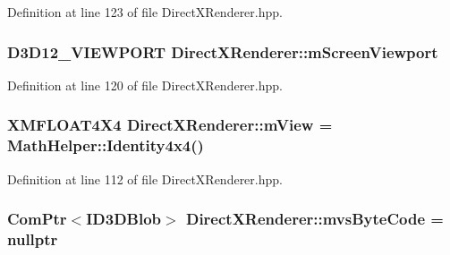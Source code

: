 Definition at line 123 of file Direct\+X\+Renderer.\+hpp.

\subsubsection[{\texorpdfstring{m\+Screen\+Viewport}{mScreenViewport}}]{\setlength{\rightskip}{0pt plus 5cm}D3\+D12\+\_\+\+V\+I\+E\+W\+P\+O\+RT Direct\+X\+Renderer\+::m\+Screen\+Viewport\hspace{0.3cm}{\ttfamily [protected]}}\hypertarget{class_direct_x_renderer_a09101a474a851ed120e597221f35f0e5_a09101a474a851ed120e597221f35f0e5}{}\label{class_direct_x_renderer_a09101a474a851ed120e597221f35f0e5_a09101a474a851ed120e597221f35f0e5}


Definition at line 120 of file Direct\+X\+Renderer.\+hpp.

\subsubsection[{\texorpdfstring{m\+View}{mView}}]{\setlength{\rightskip}{0pt plus 5cm}X\+M\+F\+L\+O\+A\+T4\+X4 Direct\+X\+Renderer\+::m\+View = {\bf Math\+Helper\+::\+Identity4x4}()\hspace{0.3cm}{\ttfamily [protected]}}\hypertarget{class_direct_x_renderer_a0fb814f0d43d2ce2c6bacfd93471e4f6_a0fb814f0d43d2ce2c6bacfd93471e4f6}{}\label{class_direct_x_renderer_a0fb814f0d43d2ce2c6bacfd93471e4f6_a0fb814f0d43d2ce2c6bacfd93471e4f6}


Definition at line 112 of file Direct\+X\+Renderer.\+hpp.

\subsubsection[{\texorpdfstring{mvs\+Byte\+Code}{mvsByteCode}}]{\setlength{\rightskip}{0pt plus 5cm}Com\+Ptr$<$I\+D3\+D\+Blob$>$ Direct\+X\+Renderer\+::mvs\+Byte\+Code = nullptr\hspace{0.3cm}{\ttfamily [protected]}}\hypertarget{class_direct_x_renderer_a795777c3f460bc862af3d8be68db0826_a795777c3f460bc862af3d8be68db0826}{}\label{class_direct_x_renderer_a795777c3f460bc862af3d8be68db0826_a795777c3f460bc862af3d8be68db0826}


